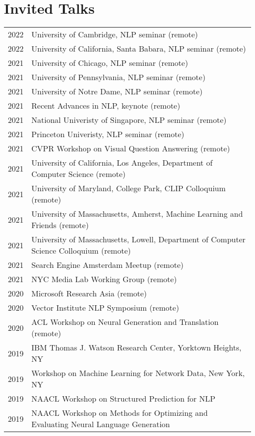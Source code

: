 \documentclass[a4paper,11pt]{article}
\begin{document}
\section{Invited Talks}
\begin{longtable}{rl}
    2022 & University of Cambridge, NLP seminar (remote) \\
    2022 & University of California, Santa Babara, NLP seminar (remote) \\
    2021 & University of Chicago, NLP seminar (remote) \\
    2021 & University of Pennsylvania, NLP seminar (remote) \\
    2021 & University of Notre Dame, NLP seminar (remote) \\
    2021 & Recent Advances in NLP, keynote (remote) \\
    2021 & National Univeristy of Singapore, NLP seminar (remote) \\
    2021 & Princeton Univeristy, NLP seminar (remote) \\
    2021 & CVPR Workshop on Visual Question Answering (remote) \\
    2021 & University of California, Los Angeles, Department of Computer Science (remote) \\
    2021 & University of Maryland, College Park, CLIP Colloquium (remote) \\
    2021 & University of Massachusetts, Amherst, Machine Learning and Friends (remote) \\
    2021 & University of Massachusetts, Lowell, Department of Computer Science Colloquium (remote) \\
    2021 & Search Engine Amsterdam Meetup (remote) \\
    2021 & NYC Media Lab Working Group (remote) \\
    2020 & Microsoft Research Asia (remote) \\
    2020 & Vector Institute NLP Symposium (remote) \\
    2020 & ACL Workshop on Neural Generation and Translation (remote) \\
    2019 & IBM Thomas J. Watson Research Center, Yorktown Heights, NY \\
    2019 & Workshop on Machine Learning for Network Data, New York, NY \\
    2019 & NAACL Workshop on Structured Prediction for NLP \\
    2019 & NAACL Workshop on Methods for Optimizing and Evaluating Neural Language Generation \\

\end{longtable}
\end{document}
